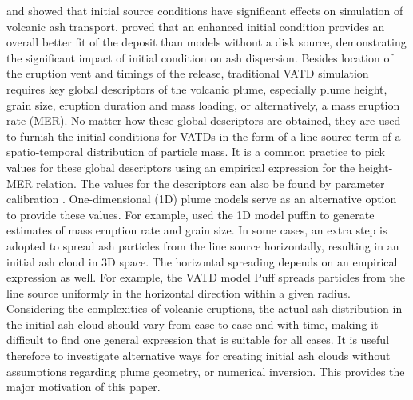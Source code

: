 \documentclass[utf8]{frontiersSCNS} %
\begin{document}
\citet{fero2009simulating} and \citet{stohl2011determination} showed that initial source conditions have significant effects on simulation of volcanic ash transport. \citet{constantinescu2021radius} proved that an enhanced initial condition provides an overall better fit of the deposit than models without a disk source, demonstrating the significant impact of initial condition on ash dispersion. Besides  location of the eruption vent and timings of the release, traditional VATD simulation requires key global descriptors of the volcanic plume, especially plume height, grain size, eruption duration and mass loading, or alternatively, a mass eruption rate (MER). No matter how these global descriptors are obtained, they are used to furnish the initial conditions for VATDs in the form of a line-source term of a spatio-temporal distribution of particle mass. It is a common practice to pick values for these global descriptors using an empirical expression for the height-MER relation. The values for the descriptors can also be found by parameter calibration \citep[e.g.][]{fero2008simulation,fero2009simulating, stohl2011determination, zidikheri2017estimation}. One-dimensional (1D) plume models serve as an alternative option to provide these values. For example, \citet{bursik2012estimation} used the 1D model puffin \citep{bursik2001effect} to generate estimates of mass eruption rate and grain size. In some cases, an extra step is adopted to spread ash particles from the line source horizontally, resulting in an initial ash cloud in 3D space. The horizontal spreading depends on an empirical expression as well. For example, the VATD model Puff spreads particles from the line source uniformly in the horizontal direction within a given radius. Considering the complexities of volcanic eruptions, the actual ash distribution in the initial ash cloud should vary from case to case and with time, making it difficult to find one general expression that is suitable for all cases. It is useful therefore to investigate alternative ways for creating initial ash clouds without assumptions regarding plume geometry, or numerical inversion. This provides the major motivation of this paper.
\end{document}
